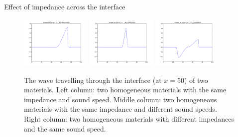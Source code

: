 \documentclass{beamer}
\begin{document}
\begin{frame}{Effect of impedance across the interface}
\begin{figure}
    \includegraphics[width=0.3\textwidth]{homo4.png}
  \includegraphics[width=0.3\textwidth]{sound4.png}
  \includegraphics[width=0.3\textwidth]{reflect4.png}
  \caption{The wave travelling through the interface (at $x=50$) of two materials. Left column: two homogeneous materials with the same impedance and sound speed. Middle column: two homogeneous materials with the same impedance and different sound speeds. Right column: two homogeneous materials with different impedances and the same sound speed.}
  \label{imp}
\end{figure}
\end{frame}
\end{document}
